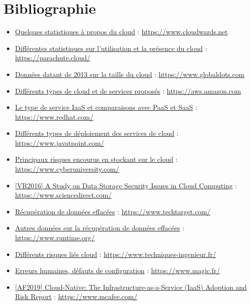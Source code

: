 \documentclass[a4paper, 12pt]{article}
\begin{document}
  \section{Bibliographie}
    \begin{itemize}
      \item \href{https://www.cloudwards.net/cloud-computing-statistics/}{Quelques statistiques à propos du cloud} : \url{https://www.cloudwards.net}
      \item \href{https://parachute.cloud/cloud-computing-statistics/}{Différentes statistiques sur l'utilisation et la présence du cloud} : \url{https://parachute.cloud/}
      \item \href{https://www.globaldots.com/resources/blog/how-much-is-stored-in-the-cloud/}{Données datant de 2013 sur la taille du cloud} : \url{https://www.globaldots.com}
      \item \href{https://aws.amazon.com/fr/types-of-cloud-computing/}{Différents types de cloud et de services proposés} : \url{https://aws.amazon.com}
      \item \href{https://www.redhat.com/fr/topics/cloud-computing/what-is-iaas}{Le type de service IaaS et comparaisons avec PaaS et SaaS} : \url{https://www.redhat.com/}
      \item \href{https://www.javatpoint.com/cloud-deployment-model}{Différents types de déploiement des services de cloud} : \url{https://www.javatpoint.com/}
      \item \href{https://www.cyberuniversity.com/post/la-securite-dans-le-cloud-principaux-risques-et-challenges}{Principaux risques encourus en stockant sur le cloud} : \url{https://www.cyberuniversity.com/}
      \item \href{https://www.sciencedirect.com/science/article/pii/S1877050916315812}{[VR2016] A Study on Data Storage Security Issues in Cloud Computing} : \url{https://www.sciencedirect.com/}
      \item \href{https://www.techtarget.com/searchdisasterrecovery/definition/data-recovery}{Récupération de données effacées} : \url{https://www.techtarget.com/}
      \item \href{https://www.runtime.org/recoverability.htm}{Autres données sur la récupération de données effacées} : \url{https://www.runtime.org/}
      \item \href{https://www.techniques-ingenieur.fr/actualite/articles/la-securite-dans-le-cloud-une-approche-fournisseur-basee-sur-les-risques-15550/}{Différents risques liés cloud} : \url{https://www.techniques-ingenieur.fr/}
      \item \href{https://www.magic.fr/cloud-public-les-erreurs-de-configuration-sont-extremement-frequentes/}{Erreurs humaines, défauts de configuration} : \url{https://www.magic.fr/}
      \item \href{https://www.mcafee.com/enterprise/en-us/assets/reports/restricted/rp-cloud-adoption-risk-report-iaas.pdf}{[AF2019] Cloud-Native: The Infrastructure-as-a-Service
(IaaS) Adoption and Risk Report} : \url{https://www.mcafee.com/}
    \end{itemize}
\end{document}
